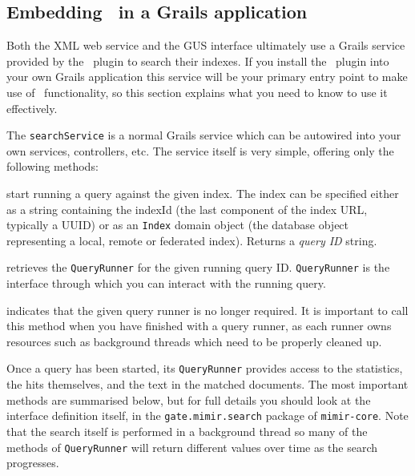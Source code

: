 
\subsection{Embedding \Mimir\ in a Grails application}
\label{sec:search:grails}

Both the XML web service and the GUS interface ultimately use a Grails service
provided by the \Mimir\ plugin to search their indexes.  If you install the
\Mimir\ plugin into your own Grails application this service will be your
primary entry point to make use of \Mimir\ functionality, so this section
explains what you need to know to use it effectively.

The {\tt searchService} is a normal Grails service which can be autowired into
your own services, controllers, etc.  The service itself is very simple,
offering only the following methods:

\bde
\item[postQuery(index, queryString)] start running a query against the given
  index.  The index can be specified either as a string containing the indexId
  (the last component of the index URL, typically a UUID) or as an {\tt Index}
  domain object (the database object representing a local, remote or federated
  index).  Returns a {\em query ID} string.
\item[getQueryRunner(queryId)] retrieves the {\tt QueryRunner} for the given
  running query ID.  {\tt QueryRunner} is the interface through which you can
  interact with the running query.
\item[closeQueryRunner(queryId)] indicates that the given query runner is no
  longer required.  It is important to call this method when you have finished
  with a query runner, as each runner owns resources such as background threads
  which need to be properly cleaned up.
\ede

Once a query has been started, its {\tt QueryRunner} provides access to the
statistics, the hits themselves, and the text in the matched documents.  The
most important methods are summarised below, but for full details you should
look at the interface definition itself, in the {\tt gate.mimir.search} package
of {\tt mimir-core}.  Note that the search itself is performed in a background
thread so many of the methods of {\tt QueryRunner} will return different values
over time as the search progresses.

